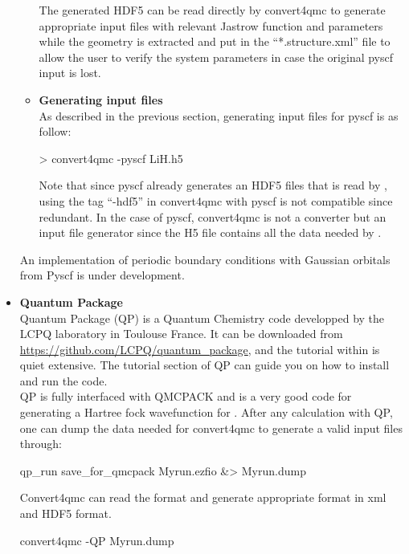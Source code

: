 \begin{itemize}
\begin{itemize}
The generated HDF5 can be read directly by convert4qmc to generate appropriate input files with relevant Jastrow function and parameters while the geometry is extracted and put in the ``*.structure.xml'' file to allow the user to verify the system parameters in case the original pyscf input is lost.\\
 \item \textbf{Generating input files}\\
 
 As described in the previous section, generating input files for pyscf is as follow:\\
 \begin{shade}
  > convert4qmc -pyscf LiH.h5 
 \end{shade}

Note that since pyscf already generates an HDF5 files that is read by \qmcpack, using the tag ``-hdf5'' in convert4qmc with pyscf is not compatible since redundant. In the case of pyscf, convert4qmc is not a converter but an input file generator since the H5 file contains all the data needed by \qmcpack. 
\end{itemize}

 An implementation of periodic boundary conditions with Gaussian orbitals from Pyscf is under development. 

\item \textbf{Quantum Package}\\
Quantum Package\cite{QP} (QP) is a Quantum Chemistry code developped by the LCPQ laboratory in Toulouse France. It can be downloaded from \url{https://github.com/LCPQ/quantum_package}, and the tutorial within is quiet extensive. The tutorial section of QP can guide you on how to install and run the code.\\
QP is fully interfaced with QMCPACK and is a very good code for generating a Hartree fock wavefunction for \qmcpack. After any calculation with QP, one can dump the data needed for convert4qmc to generate a valid \qmcpack input files through:\\
\begin{shade}
 qp_run save_for_qmcpack Myrun.ezfio &> Myrun.dump
\end{shade}

Convert4qmc can read the format and generate appropriate format in xml and HDF5 format.

\begin{shade}
 convert4qmc -QP Myrun.dump
\end{shade}



\end{itemize}

